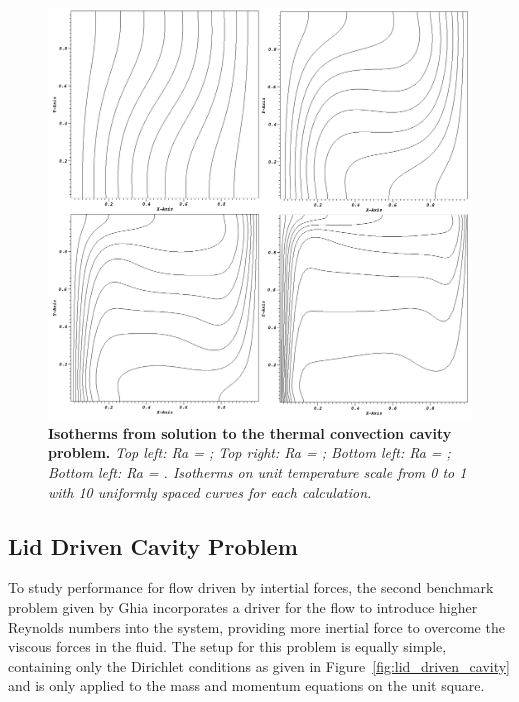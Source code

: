 \begin{figure}[t!]
  \begin{center}
    \includegraphics[width=6in]{chapters/nonlinear_problem/convection_isotherms.png}
  \end{center}
  \caption{\textbf{Isotherms from solution to the thermal convection
        cavity problem.} \textit{Top left: Ra = ; Top right:
        Ra = ; Bottom left: Ra = ; Bottom left: Ra =
        . Isotherms on unit temperature scale from 0 to 1
        with 10 uniformly spaced curves for each calculation.}}
  \label{fig:convection_isotherms}
\end{figure}

\clearpage

\subsection{Lid Driven Cavity Problem}
\label{subsec:lid_driven_cavity}
To study performance for flow driven by intertial forces, the second
benchmark problem given by Ghia \citep{ghia_high-re_1982} incorporates
a driver for the flow to introduce higher Reynolds numbers into the
system, providing more inertial force to overcome the viscous forces
in the fluid. The setup for this problem is equally simple, containing
only the Dirichlet conditions as given in
Figure~\ref{fig:lid_driven_cavity} and is only applied to the mass and
momentum equations on the unit square.

